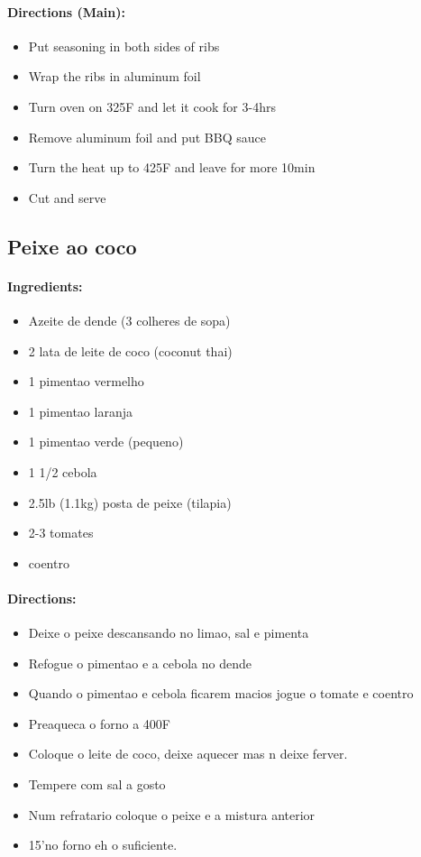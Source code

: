 \documentclass{article}
\begin{document}
\paragraph{Directions (Main):}
\begin{itemize}
	\item Put seasoning in both sides of ribs 
	\item Wrap the ribs in aluminum foil 
	\item Turn oven on 325F and let it cook for 3-4hrs 
	\item Remove aluminum foil and put BBQ sauce 
	\item Turn the heat up to 425F and leave for more 10min 
	\item Cut and serve
\end{itemize}

\subsection{Peixe ao coco}

\paragraph{Ingredients:}

\begin{itemize}
	\item Azeite de dende (3 colheres de sopa)
	\item 2 lata de leite de coco (coconut thai)
	\item 1 pimentao vermelho
	\item 1 pimentao laranja
	\item 1 pimentao verde (pequeno)
	\item 1 1/2 cebola
	\item 2.5lb (1.1kg) posta de peixe (tilapia)
	\item 2-3 tomates
	\item coentro
\end{itemize}

\paragraph{Directions:}
\begin{itemize}
	\item Deixe o peixe descansando no limao, sal e pimenta
	\item Refogue o pimentao e a cebola no dende
	\item Quando o pimentao e cebola ficarem macios jogue o tomate e coentro
	\item Preaqueca o forno a 400F
	\item Coloque o leite de coco, deixe aquecer mas n deixe ferver. 
	\item Tempere com sal a gosto
	\item Num refratario coloque o peixe e a mistura anterior
	\item 15'no forno eh o suficiente.
\end{itemize} 
\end{document}
